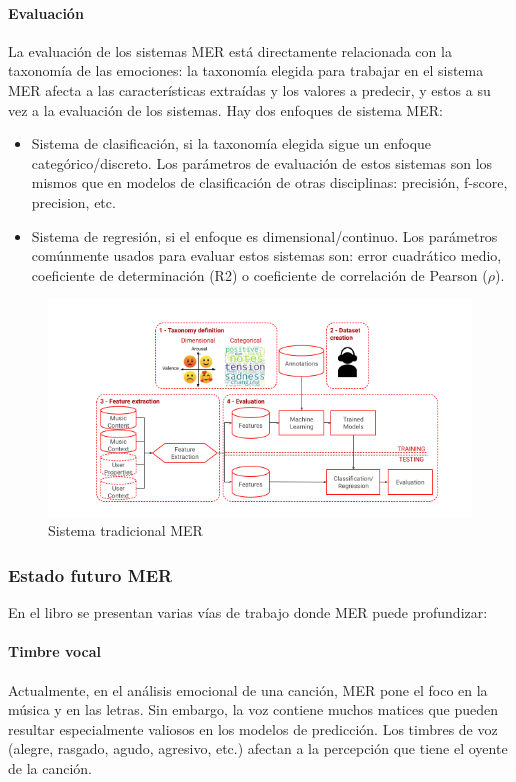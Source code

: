 \documentclass[12pt,a4paper,Spanish]{article}
\begin{document}
\paragraph{Evaluación}
La evaluación de los sistemas MER está directamente relacionada con la taxonomía de las emociones: la taxonomía elegida para trabajar en el sistema MER afecta a las características extraídas y los valores a predecir, y estos a su vez a la evaluación de los sistemas. Hay dos enfoques de sistema MER:
\begin{itemize}
	\item Sistema de clasificación, si la taxonomía elegida sigue un enfoque categórico/discreto. Los parámetros de evaluación de estos sistemas son los mismos que en modelos de clasificación de otras disciplinas: precisión, f-score, precision, etc.
	\item Sistema de regresión, si el enfoque es dimensional/continuo. Los parámetros comúnmente usados para evaluar estos sistemas son: error cuadrático medio, coeficiente de determinación (R2) o coeficiente de correlación de Pearson ($\rho$).
\end{itemize}
\begin{figure}[H]
	\centering
	\includegraphics[width=0.7\linewidth]{figs/mer_traditional_system}
	\caption{Sistema tradicional MER \cite{GomezCanon2021SPM}}
	\label{fig:mertraditionalsystem}
\end{figure}
\subsubsection{Estado futuro MER}
En el libro  se presentan varias vías de trabajo donde MER puede profundizar:

\paragraph{Timbre vocal}
Actualmente, en el análisis emocional de una canción, MER pone el foco en la música y en las letras. Sin embargo, la voz contiene muchos matices que pueden resultar  especialmente valiosos en los modelos de predicción. Los timbres de voz (alegre, rasgado, agudo, agresivo, etc.) afectan a la percepción que tiene el oyente de la canción.
\newline
\end{document}
